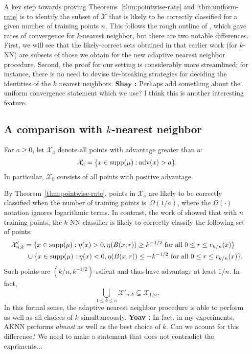 \documentclass{article}
\def\X{{\mathcal X}}
\def\supp{{\rm supp}}
\def\adv{{\rm adv}}
\newcommand{\comment}[3]{{\color{#1} {\bf #2 :} #3}}
\newcommand{\shay}[1]{\comment{purple}{Shay}{#1}}
\newcommand{\yoav}[1]{\comment{green}{Yoav}{#1}}
\begin{document}
A key step towards proving Theorems~\ref{thm:pointwise-rate} and \ref{thm:uniform-rate} is to identify the subset of $\X$ that is likely to be correctly classified for a given number of training points $n$. This follows the rough outline of \cite{ChaudhuriDasgupta2014}, which gave rates of convergence for $k$-nearest neighbor, but there are two notable differences. First, we will see that the likely-correct sets obtained in that earlier work (for $k$-NN) are subsets of those we obtain for the new adaptive nearest neighbor procedure. Second, the proof for our setting is considerably more streamlined; for instance, there is no need to devise tie-breaking strategies for deciding the identities of the $k$ nearest neighbors.
\shay{Perhaps add something about the uniform convergence statement which we use? 
I think this is another interesting feature.}



\subsection{A comparison with $k$-nearest neighbor}
\label{sec:knn-comparison}

For $a \geq 0$, let $\X_a$ denote all points with advantage greater than $a$:
\begin{equation}
\X_a = \{x \in \supp(\mu): \adv(x) > a \} .
\label{eq:advantage-set}
\end{equation}
In particular, $\X_0$ consists of all points with positive advantage. 

By Theorem~\ref{thm:pointwise-rate}, points in $\X_a$ are likely to be correctly classified when the number of training points is~$\widetilde{\Omega}(1/a)$, where the $\widetilde{\Omega}(\cdot)$ notation ignores logarithmic terms.
In contrast, the work of \cite{ChaudhuriDasgupta2014} showed that with $n$ training points, the $k$-NN classifier is likely to correctly classify the following set of points:
\begin{align*}
\X'_{n,k} &= \{x \in \supp(\mu): \eta(x) > 0, \eta(B(x,r)) \geq k^{-1/2} \mbox{\ for all $0 \leq r \leq r_{k/n}(x)$}\} \\
&\ \cup \{x \in \supp(\mu): \eta(x) < 0, \eta(B(x,r)) \leq -k^{-1/2} \mbox{\ for all $0 \leq r \leq r_{k/n}(x)$}\} .
\end{align*}
Such points are $(k/n, k^{-1/2})$-salient and thus have advantage at least $1/n$. In fact,
$$ \bigcup_{1 \leq k \leq n} \X'_{n,k} \subseteq \X_{1/n} .$$
In this formal sense, the adaptive nearest neighbor procedure is able to perform as well as all choices of $k$ simultaneously.
\yoav{In fact, in my experiments, AKNN performs {\em almost} as well
  as the best choice of $k$. Can we acount for this difference? We
  need to make a statement that does not contradict the expriments...}
\end{document}
